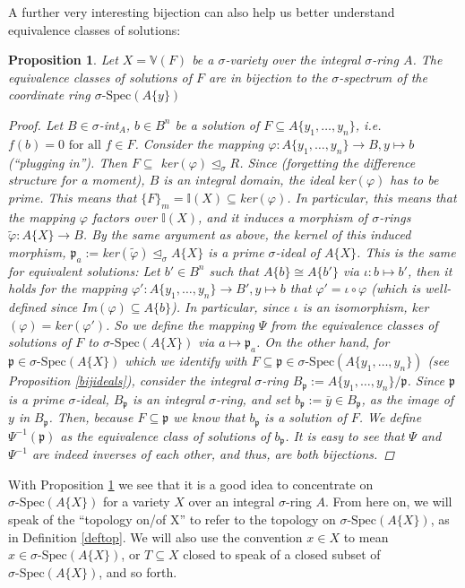 \documentclass{article}
\def\I{\mathbb{I}}
\def\VV{\mathbb{V}}
\def\p{\mathfrak{p}}
\def\s{\sigma}
\def\si{\unlhd_{\sigma}}
\def\sSpec{\sigma\text{-Spec}}
\def\fa{\text{ for all }}
\newenvironment{bew}{\begin{proof}[Proof]}{\end{proof}}
\theoremstyle{plain}
\newtheorem{prop}[Satz]{Proposition}
\theoremstyle{definition}
\begin{document}
A further very interesting bijection can also help us better understand equivalence classes of solutions: 
\begin{prop}\label{bijsols}
Let $X = \VV(F)$ be a $\s$-variety over the integral $\s$-ring $A$. The equivalence classes of solutions of $F$ are in bijection to the $\s$-spectrum of the coordinate ring $\sSpec(A\{y\})$
\begin{bew}
Let $B \in \s$-int$_A$, $b \in B^n$ be a solution of $F \subseteq A\{y_1,\ldots,y_n\}$, i.e. $f(b) = 0 \fa f \in F$. Consider the mapping $\varphi: A\{y_1,\ldots,y_n\} \rightarrow B, y \mapsto b$ (``plugging in''). Then $F \subseteq $ ker$( \varphi) \si R$.
Since (forgetting the difference structure for a moment), $B$ is an integral domain, the ideal ker$(\varphi)$ has to be prime. This means that $\{F\}_m = \I(X) \subseteq $ker$(\varphi)$. 
In particular, this means that the mapping $\varphi$ factors over $\I(X)$, and it induces a morphism of $\s$-rings $\tilde \varphi: A\{X\} \rightarrow B$. By the same argument as above, the kernel of this induced
morphism, $\p_a := $ker$(\tilde \varphi) \si A\{X\}$ is a prime $\s$-ideal of $A\{X\}$. This is the same for equivalent solutions: Let $b' \in B^n$ such that $A\{b\} \cong A\{b'\}$ via $\iota: b \mapsto b'$, 
then it holds for the mapping $\varphi': A\{y_1, \ldots, y_n\} \rightarrow B', y \mapsto b$ that $\varphi' = \iota \circ \varphi$ (which is well-defined since Im$(\varphi)\subseteq A\{b\}$). In particular, since $\iota$ is an isomorphism, ker$(\varphi) = $ker$(\varphi')$.
So we define the mapping $\Psi$ from the equivalence classes of solutions of $F$ to $\sSpec(A\{X\})$ via $a \mapsto \p_a$. On the other hand, for $\p \in \sSpec(A\{X\})$ which we identify with $F \subseteq \p \in \sSpec(A\{y_1,\ldots,y_n\})$ (see Proposition \ref{bijideals}), consider the integral $\s$-ring $B_\p:= A\{y_1,\ldots,y_n\}/\p$.
Since $\p$ is a prime $\s$-ideal, $B_\p$ is an integral $\s$-ring, and set $b_\p := \bar y \in B_\p$, as the image of $y$ in $B_\p$. Then, because $F \subseteq \p$ we know that $b_\p$ is a solution of $F$. 
We define $\Psi^{-1}(\p)$ as the equivalence class of solutions of $b_\p$. It is easy to see that $\Psi$ and $\Psi^{-1}$ are indeed inverses of each other, and thus, are both bijections.
\end{bew}
\end{prop}

With Proposition \ref{bijsols} we see that it is a good idea to concentrate on $\sSpec(A\{X\})$ for a variety $X$ over an integral $\s$-ring $A$.
 From here on, we will speak of the ``topology on/of X'' to refer to the topology on $\sSpec(A\{X\})$, as in Definition \ref{deftop}. 
We will also use the convention $x \in X$ to mean $x \in \sSpec(A\{X\})$, or $T \subseteq X$ closed to speak of a closed subset of $\sSpec(A\{X\})$, and so forth.
\end{document}
